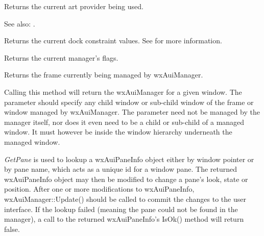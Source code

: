 
Returns the current art provider being used.

See also: .

\label{wxauimanagergetdocksizeconstraint}


Returns the current dock constraint values.  See  for more information.

\label{wxauimanagergetflags}


Returns the current manager's flags.

\label{wxauimanagergetmanagedwindow}


Returns the frame currently being managed by wxAuiManager.

\label{wxauimanagergetmanager}


Calling this method will return the wxAuiManager for a given window.  The  parameter should
specify any child window or sub-child window of the frame or window managed by wxAuiManager.
The  parameter need not be managed by the manager itself, nor does it even need to be a child
or sub-child of a managed window.  It must however be inside the window hierarchy underneath the managed
window.

\label{wxauimanagergetpane}



{\it GetPane} is used to lookup a wxAuiPaneInfo object
either by window pointer or by pane name, which acts as a unique id for
a window pane. The returned wxAuiPaneInfo object may then be modified to
change a pane's look, state or position. After one or more
modifications to wxAuiPaneInfo, wxAuiManager::Update() should be called
to commit the changes to the user interface. If the lookup failed
(meaning the pane could not be found in the manager), a call to the
returned wxAuiPaneInfo's IsOk() method will return false.

